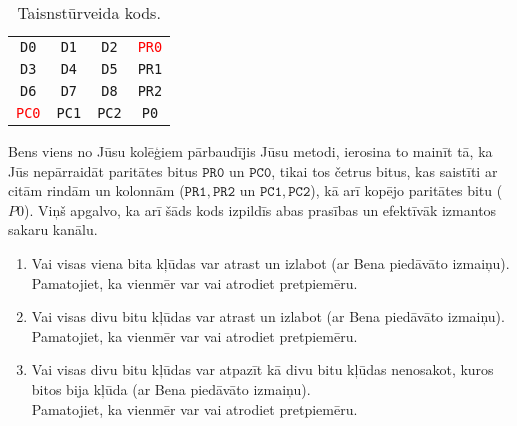 \documentclass[a4paper,12pt]{article}
\begin{document}
\begin{table}[h]
\begin{center}
\begin{tabular}{cccc}
{\tt D0} & {\tt D1} & {\tt D2} & \textcolor{red}{\tt PR0} \\
{\tt D3} & {\tt D4} & {\tt D5} & {\tt PR1} \\
{\tt D6} & {\tt D7} & {\tt D8} & {\tt PR2} \\
\textcolor{red}{\tt PC0} & {\tt PC1} & {\tt PC2} & {\tt P0} \\
\end{tabular}
\caption{\label{tab:rectangular} Taisnstūrveida kods.}
\end{center}
\end{table}

Bens \textendash{} viens no Jūsu kolēģiem \textendash{} pārbaudījis Jūsu
metodi, ierosina to mainīt tā, ka Jūs nepārraidāt paritātes bitus
$\mathtt{PR0}$ un $\mathtt{PC0}$, tikai tos četrus bitus, kas
saistīti ar citām rindām un kolonnām 
($\mathtt{PR1},\mathtt{PR2}$ un $\mathtt{PC1},\mathtt{PC2}$), 
kā arī kopējo paritātes bitu ($P0$).
Viņš apgalvo, ka arī šāds kods izpildīs abas prasības 
un efektīvāk izmantos sakaru kanālu.
\begin{enumerate}
\item Vai visas viena bita kļūdas var atrast un izlabot (ar Bena piedāvāto izmaiņu).\\ 
Pamatojiet, ka vienmēr var vai atrodiet pretpiemēru. 
\item Vai visas divu bitu kļūdas var atrast un izlabot (ar Bena piedāvāto izmaiņu).\\
Pamatojiet, ka vienmēr var vai atrodiet pretpiemēru. 
\item Vai visas divu bitu kļūdas var atpazīt kā divu bitu kļūdas \textendash{} 
nenosakot, kuros bitos bija kļūda (ar Bena piedāvāto izmaiņu).\\
Pamatojiet, ka vienmēr var vai atrodiet pretpiemēru. 
\end{enumerate}
\end{document}
